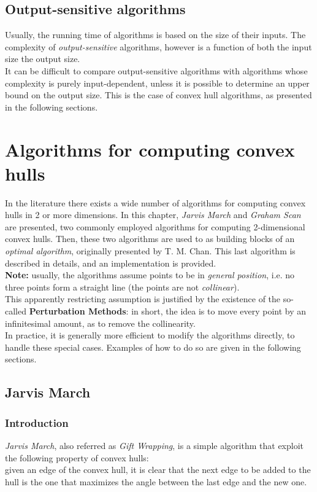 \documentclass[
12pt,
a4paper,
oneside,
headinclude,
footinclude]{report}
\theoremstyle{definition} %
\begin{document}
\section{Output-sensitive algorithms}
Usually, the running time of algorithms is based on the size of their inputs. The complexity of \textit{output-sensitive} algorithms, however is a function of both the input size the output size. \cite{Chan1996}\\
It can be difficult to compare output-sensitive algorithms with algorithms whose complexity is purely input-dependent, unless it is possible to determine an upper bound on the output size.
This is the case of convex hull algorithms, as presented in the following sections.




\chapter{Algorithms for computing convex hulls}
In the literature there exists a wide number of algorithms for computing convex hulls in 2 or more dimensions. In this chapter, \textit{Jarvis March} and \textit{Graham Scan} are presented, two commonly employed algorithms for computing 2-dimensional convex hulls. Then, these two algorithms are used to as building blocks of an \textit{optimal algorithm}, originally presented by T. M. Chan. \cite{Chan1996}
This last algorithm is described in details, and an implementation is provided.\\

\textbf{Note:} usually, the algorithms assume points to be in \textit{general position}, i.e. no three points form a straight line (the points are not \textit{collinear}).\\
This apparently restricting assumption is justified by the existence of the so-called \textbf{Perturbation Methods}: in short, the idea is to move every point by an infinitesimal amount, as to remove the collinearity. \cite{Emiris:1991:EAR:894044}\\
In practice, it is generally more efficient to modify the algorithms directly, to handle these special cases. Examples of how to do so are given in the following sections.
\section{Jarvis March} 
\subsection{Introduction}
\textit{Jarvis March}, also referred as \textit{Gift Wrapping}, is a simple algorithm that exploit the following property of convex hulls:\\
given an edge of the convex hull, it is clear that the next edge to be added to the hull is the one that maximizes the angle between the last edge and the new one.\\
\end{document}
